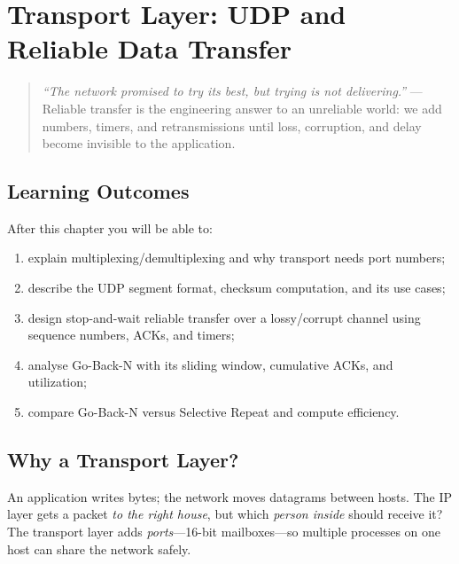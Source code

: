 \chapter{Transport Layer: UDP and Reliable Data Transfer}
\label{ch:transport-udp}

\begin{quote}
\emph{``The network promised to try its best, but trying is not delivering.''} --- Reliable transfer is the engineering answer to an unreliable world: we add numbers, timers, and retransmissions until loss, corruption, and delay become invisible to the application.
\end{quote}

\noindent{}
\vspace{0.4em}

\section*{Learning Outcomes}
After this chapter you will be able to:
\begin{enumerate}[label=(L\arabic*)]
    \item explain multiplexing/demultiplexing and why transport needs port numbers;
    \item describe the UDP segment format, checksum computation, and its use cases;
    \item design stop-and-wait reliable transfer over a lossy/corrupt channel using sequence numbers, ACKs, and timers;
    \item analyse Go-Back-N with its sliding window, cumulative ACKs, and utilization;
    \item compare Go-Back-N versus Selective Repeat and compute efficiency.
\end{enumerate}

\section{Why a Transport Layer?}
\label{sec:why-transport}
An application writes bytes; the network moves datagrams between hosts. The IP layer gets a packet \emph{to the right house}, but which \emph{person inside} should receive it? The transport layer adds \emph{ports}---16-bit mailboxes---so multiple processes on one host can share the network safely.

